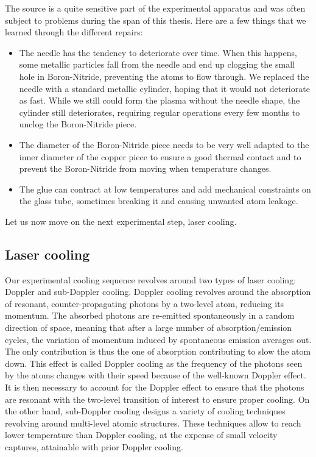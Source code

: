 The source is a quite sensitive part of the experimental apparatus and was often subject to problems during the span of this thesis. Here are a few things that we learned through the different repairs:

\begin{itemize}
    \item The needle has the tendency to deteriorate over time. When this happens, some metallic particles fall from the needle and end up clogging the small hole in Boron-Nitride, preventing the atoms to flow through. We replaced the needle with a standard metallic cylinder, hoping that it would not deteriorate as fast. While we still could form the plasma without the needle shape, the cylinder still deteriorates, requiring regular operations every few months to unclog the Boron-Nitride piece.
    \item The diameter of the Boron-Nitride piece needs to be very well adapted to the inner diameter of the copper piece to ensure a good thermal contact and to prevent the Boron-Nitride from moving when temperature changes.
    \item The glue can contract at low temperatures and add mechanical constraints on the glass tube, sometimes breaking it and causing unwanted atom leakage.
\end{itemize}

Let us now move on the next experimental step, laser cooling.


\subsection{Laser cooling}

Our experimental cooling sequence revolves around two types of laser cooling: Doppler and sub-Doppler cooling. Doppler cooling revolves around the absorption of resonant, counter-propagating photons by a two-level atom, reducing its momentum. The absorbed photons are re-emitted spontaneously in a random direction of space, meaning that after a large number of absorption/emission cycles, the variation of momentum induced by spontaneous emission averages out. The only contribution is thus the one of absorption contributing to slow the atom down. This effect is called Doppler cooling as the frequency of the photons seen by the atoms changes with their speed because of the well-known Doppler effect. It is then necessary to account for the Doppler effect to ensure that the photons are resonant with the two-level transition of interest to ensure proper cooling. On the other hand, sub-Doppler cooling designs a variety of cooling techniques revolving around multi-level atomic structures. These techniques allow to reach lower temperature than Doppler cooling, at the expense of small velocity captures, attainable with prior Doppler cooling. 

